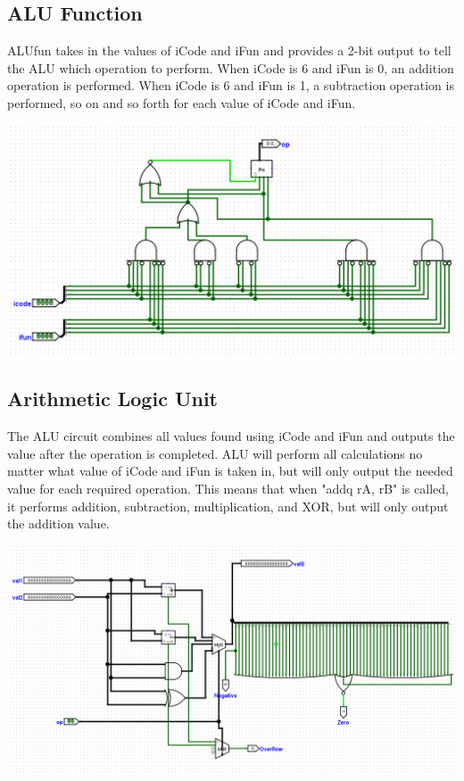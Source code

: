 \documentclass{article}
\begin{document}
\subsection{ALU Function}
ALUfun takes in the values of iCode and iFun and provides a 2-bit output to tell the ALU which operation to perform. When iCode is 6 and iFun is 0, an addition operation is performed. When iCode is 6 and iFun is 1, a subtraction operation is performed, so on and so forth for each value of iCode and iFun. 
\begin{center}
    \includegraphics[scale=.6]{alu_fun.png} \\
\end{center}
\subsection{Arithmetic Logic Unit}
The ALU circuit combines all values found using iCode and iFun and outputs the value after the operation is completed. ALU will perform all calculations no matter what value of iCode and iFun is taken in, but will only output the needed value for each required operation. This means that when "addq rA, rB" is called, it performs addition, subtraction, multiplication, and XOR, but will only output the addition value. 
\begin{center}
    \includegraphics[scale=.5]{alu.png} \\
\end{center}
\pagebreak
\end{document}
